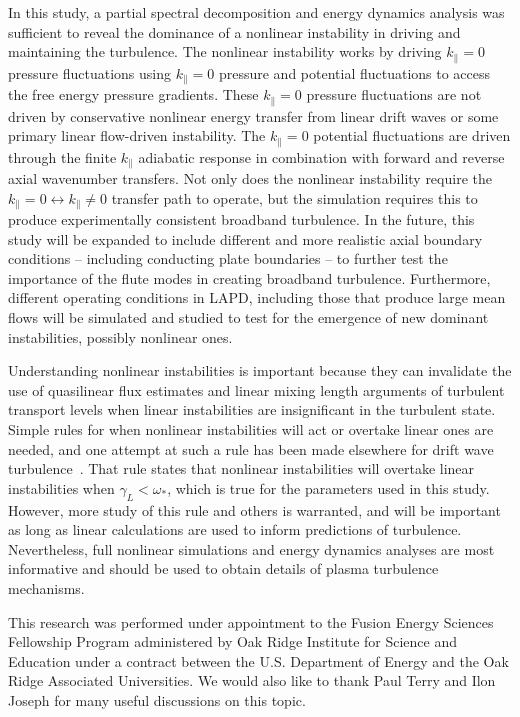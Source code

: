 \documentclass[showpacs,preprintnumbers,amsmath,amssymb,superscriptaddress,aip]{revtex4-1}
\begin{document}
In this study, a partial spectral decomposition and energy dynamics analysis was sufficient to reveal the dominance of a nonlinear instability in driving and maintaining the turbulence.
The nonlinear instability works by driving $k_\parallel = 0$ pressure fluctuations using $k_\parallel = 0$ pressure and potential fluctuations to access the free energy pressure gradients.
These $k_\parallel = 0$ pressure fluctuations are not driven by conservative nonlinear energy transfer from linear drift waves or some primary linear flow-driven instability.
The $k_\parallel = 0$ potential fluctuations are driven through the finite $k_\parallel$ adiabatic response in combination with forward and reverse axial wavenumber transfers. Not only
does the nonlinear instability require the $k_\parallel = 0 \leftrightarrow k_\parallel \ne 0$ transfer path to operate, but the simulation requires this to produce experimentally
consistent broadband turbulence. In the future, this study will be expanded to include different and more realistic axial boundary conditions -- including conducting plate boundaries --
to further test the importance of the flute modes in creating broadband turbulence. Furthermore, different operating conditions in LAPD, including those that produce large mean flows
will be simulated and studied to test for the emergence of new dominant instabilities, possibly nonlinear ones.
 
Understanding nonlinear instabilities is important because they can invalidate the use of quasilinear flux estimates and linear mixing length arguments of turbulent transport 
levels when linear instabilities are insignificant in the turbulent state. Simple rules for when nonlinear instabilities will act or overtake linear ones are needed, and one attempt at such
a rule has been made elsewhere for drift wave turbulence~\cite{scott2005}. That rule states that nonlinear instabilities will overtake linear instabilities when $\gamma_L < \omega_*$, which is true
for the parameters used in this study. However, more study of this rule and others is warranted, and will be important as long as linear calculations are used to inform predictions of turbulence.
Nevertheless, full nonlinear simulations and energy dynamics analyses
are most informative and should be used to obtain details of plasma
turbulence mechanisms.


\begin{acknowledgments}
This research was performed under appointment to the Fusion Energy Sciences Fellowship Program administered by Oak Ridge Institute for
Science and Education under a contract between the U.S. Department of Energy and the Oak Ridge Associated Universities. We would also like to thank Paul Terry and Ilon Joseph for many
useful discussions on this topic.
\end{acknowledgments}
\end{document}
